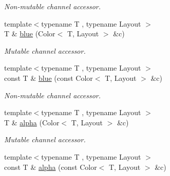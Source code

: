 \begin{DoxyCompactItemize}
\begin{DoxyCompactList}\small\item\em Non-\/mutable channel accessor. \end{DoxyCompactList}\item 
\hypertarget{group___channel_accessors_ga002fae45c069050f774c897a69e18b39}{{\footnotesize template$<$typename T , typename Layout $>$ }\\T \& \hyperlink{group___channel_accessors_ga002fae45c069050f774c897a69e18b39}{blue} (Color$<$ T, Layout $>$ \&c)}\label{group___channel_accessors_ga002fae45c069050f774c897a69e18b39}

\begin{DoxyCompactList}\small\item\em Mutable channel accessor. \end{DoxyCompactList}\item 
\hypertarget{group___channel_accessors_ga7f05f0fe577efb6d905528093fbaab0b}{{\footnotesize template$<$typename T , typename Layout $>$ }\\const T \& \hyperlink{group___channel_accessors_ga7f05f0fe577efb6d905528093fbaab0b}{blue} (const Color$<$ T, Layout $>$ \&c)}\label{group___channel_accessors_ga7f05f0fe577efb6d905528093fbaab0b}

\begin{DoxyCompactList}\small\item\em Non-\/mutable channel accessor. \end{DoxyCompactList}\item 
\hypertarget{group___channel_accessors_gaa131549883a0aae99914ffe78da0dbcb}{{\footnotesize template$<$typename T , typename Layout $>$ }\\T \& \hyperlink{group___channel_accessors_gaa131549883a0aae99914ffe78da0dbcb}{alpha} (Color$<$ T, Layout $>$ \&c)}\label{group___channel_accessors_gaa131549883a0aae99914ffe78da0dbcb}

\begin{DoxyCompactList}\small\item\em Mutable channel accessor. \end{DoxyCompactList}\item 
\hypertarget{group___channel_accessors_gaedb55300f0a4cfb17d4f281e437e1ac3}{{\footnotesize template$<$typename T , typename Layout $>$ }\\const T \& \hyperlink{group___channel_accessors_gaedb55300f0a4cfb17d4f281e437e1ac3}{alpha} (const Color$<$ T, Layout $>$ \&c)}\label{group___channel_accessors_gaedb55300f0a4cfb17d4f281e437e1ac3}


\end{DoxyCompactItemize}
